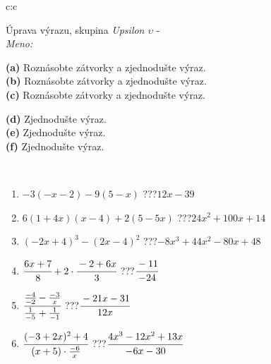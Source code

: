 \documentclass[10pt]{report}
\begin{document}
\newpage
\thispagestyle{empty}
\begin{tabular}{c:c}
\begin{minipage}[c][104.5mm][t]{0.5\linewidth}
\begin{center}
\vspace{7mm}
{\huge Úprava výrazu, skupina \textit{Upsilon $\upsilon$} -}\\[5mm]
\textit{Meno:}\phantom{xxxxxxxxxxxxxxxxxxxxxxxxxxxxxxxxxxxxxxxxxxxxxxxxxxxxxxxxxxxxxxxxx}\\[5mm]
\begin{minipage}{0.95\linewidth}
\begin{center}
{\small \begin{minipage}{0.6\textwidth}
\textbf{(a)} Roznásobte zátvorky a zjednodušte výraz. \\[1mm]
\textbf{(b)} Roznásobte zátvorky a zjednodušte výraz. \\[1mm]
\textbf{(c)} Roznásobte zátvorky a zjednodušte výraz.
\end{minipage} \begin{minipage}{0.39\textwidth}
\textbf{(d)} Zjednodušte výraz. \\[1mm]
\textbf{(e)} Zjednodušte výraz. \\[1mm]
\textbf{(f)} Zjednodušte výraz.
\end{minipage}
}
\end{center}
\end{minipage}
\\[4mm]
\begin{minipage}{0.79\linewidth}
\begin{center}
\begin{varwidth}{\linewidth}
\begin{enumerate}
\normalsize
\item $-3(-x-2)-9(5-x)$\quad \dotfill\; ???\;\dotfill \quad $12x-39$
\item $6(1+4x)(x-4)+2(5-5x)$\quad \dotfill\; ???\;\dotfill \quad $24x^2+100x+14$
\item $(-2x+4)^3-(2x-4)^2$\quad \dotfill\; ???\;\dotfill \quad $-8x^3+44x^2-80x+48$
\item $\cfrac{6x+7}{8}+2\cdot\cfrac{-2+6x}{3}$\quad \dotfill\; ???\;\dotfill \quad $\cfrac{-11}{-24}$
\item $\cfrac{\frac{-4}{-2}-\frac{-3}{x}}{\frac{1}{-5}+\frac{1}{-1}}$\quad \dotfill\; ???\;\dotfill \quad $\cfrac{-21x-31}{12x}$
\item $\cfrac{(-3+2x)^2+4}{(x+5)\cdot\frac{-6}{x}}$\quad \dotfill\; ???\;\dotfill \quad $\cfrac{4x^3-12x^2+13x}{-6x-30}$

\end{enumerate}
\end{varwidth}
\end{center}
\end{minipage}
\end{center}
\end{minipage}
\end{tabular}
\end{document}
